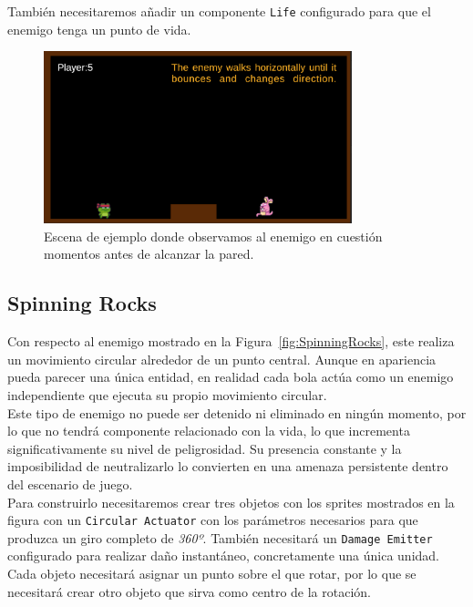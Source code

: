 También necesitaremos añadir un componente \texttt{Life} configurado para que el enemigo tenga un punto de vida.

\begin{figure}[t]
	\centering
	\includegraphics[height=5cm]{Imagenes/BouncingBunny.png}
	\caption{Escena de ejemplo donde observamos al enemigo en cuestión momentos antes de alcanzar la pared.}
	\label{fig:BouncingBunny}
\end{figure}

\subsection{Spinning Rocks}

Con respecto al enemigo mostrado en la Figura~\ref{fig:SpinningRocks}, este realiza un movimiento circular alrededor de un punto central. Aunque en apariencia pueda parecer una única entidad, en realidad cada bola actúa como un enemigo independiente que ejecuta su propio movimiento circular.\\

Este tipo de enemigo no puede ser detenido ni eliminado en ningún momento, por lo que no tendrá componente relacionado con la vida, lo que incrementa significativamente su nivel de peligrosidad. Su presencia constante y la imposibilidad de neutralizarlo lo convierten en una amenaza persistente dentro del escenario de juego.\\

Para construirlo necesitaremos crear tres objetos con los sprites mostrados en la figura con un \texttt{Circular Actuator} con los parámetros necesarios para que produzca un giro completo de \textit{360º}. También necesitará un \texttt{Damage Emitter} configurado para realizar daño instantáneo, concretamente una única unidad.\\

Cada objeto necesitará asignar un punto sobre el que rotar, por lo que se necesitará crear otro objeto que sirva como centro de la rotación.\\

